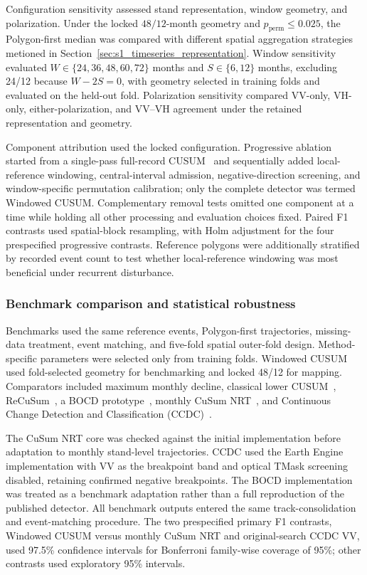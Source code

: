 Configuration sensitivity assessed stand representation, window geometry, and polarization. Under the locked $48/12$-month geometry and $p_{\mathrm{perm}}\leq0.025$, the Polygon-first median was compared with different spatial aggregation strategies metioned in Section~\ref{sec:s1_timeseries_representation}. Window sensitivity evaluated $W\in\{24,36,48,60,72\}$ months and $S\in\{6,12\}$ months, excluding 24/12 because $W-2S=0$, with geometry selected in training folds and evaluated on the held-out fold. Polarization sensitivity compared VV-only, VH-only, either-polarization, and VV--VH agreement under the retained representation and geometry.

Component attribution used the locked configuration. Progressive ablation started from a single-pass full-record CUSUM~\citep{Page1954CUSUM} and sequentially added local-reference windowing, central-interval admission, negative-direction screening, and window-specific permutation calibration; only the complete detector was termed Windowed CUSUM. Complementary removal tests omitted one component at a time while holding all other processing and evaluation choices fixed. Paired F1 contrasts used spatial-block resampling, with Holm adjustment for the four prespecified progressive contrasts. Reference polygons were additionally stratified by recorded event count to test whether local-reference windowing was most beneficial under recurrent disturbance.

\subsubsection{Benchmark comparison and statistical robustness}
\label{sec:benchmark_robustness}

Benchmarks used the same reference events, Polygon-first trajectories, missing-data treatment, event matching, and five-fold spatial outer-fold design. Method-specific parameters were selected only from training folds. Windowed CUSUM used fold-selected geometry for benchmarking and locked 48/12 for mapping. Comparators included maximum monthly decline, classical lower CUSUM~\citep{Page1954CUSUM}, ReCuSum~\citep{Ygorra2023ReCuSum}, a BOCD prototype~\citep{Bottani2026f-pol_BOCD}, monthly CuSum NRT~\citep{Ygorra2024CuSumNRT}, and Continuous Change Detection and Classification (CCDC)~\citep{Bullock2022CCDC_S1}.

The CuSum NRT core was checked against the initial implementation before adaptation to monthly stand-level trajectories. CCDC used the Earth Engine implementation with VV as the breakpoint band and optical TMask screening disabled, retaining confirmed negative breakpoints. The BOCD implementation was treated as a benchmark adaptation rather than a full reproduction of the published detector. All benchmark outputs entered the same track-consolidation and event-matching procedure. The two prespecified primary F1 contrasts, Windowed CUSUM versus monthly CuSum NRT and original-search CCDC VV, used 97.5\% confidence intervals for Bonferroni family-wise coverage of 95\%; other contrasts used exploratory 95\% intervals.

